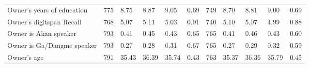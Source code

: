 \begin{table}[H]
{\begin{tabular}{lllllllllll}
\hspace{1em}Owner's years of education & 775 & 8.75 & 8.87 & 9.05 & 0.69 & 749 & 8.70 & 8.81 & 9.00 & 0.69\\
\hspace{1em}Owner's digitspan Recall & 768 & 5.07 & 5.11 & 5.03 & 0.91 & 740 & 5.10 & 5.07 & 4.99 & 0.88\\
\hspace{1em}Owner is Akan speaker & 793 & 0.41 & 0.45 & 0.43 & 0.65 & 765 & 0.41 & 0.46 & 0.43 & 0.60\\
\hspace{1em}Owner is Ga/Dangme speaker & 793 & 0.27 & 0.28 & 0.31 & 0.67 & 765 & 0.27 & 0.29 & 0.32 & 0.59\\
\hspace{1em}Owner's age & 791 & 35.43 & 36.39 & 35.74 & 0.43 & 763 & 35.37 & 36.36 & 35.79 & 0.45\\
\bottomrule
\end{tabular}}
\end{table}
